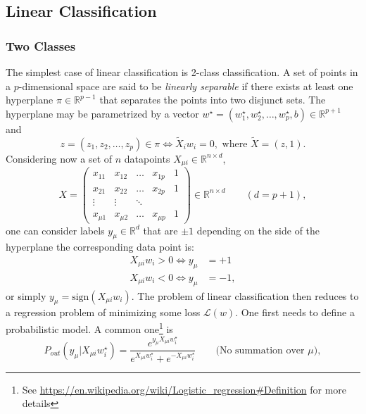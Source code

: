 \documentclass{article}
\begin{document}
\subsection{Linear Classification}
\subsubsection*{Two Classes}
The simplest case of linear classification is 2-class classification. A set of points in a $p$-dimensional space are said to be \emph{linearly separable} if there exists at least one hyperplane $\pi \in \mathbb{R}^{p-1}$ that separates the points into two disjunct sets. The hyperplane may be parametrized by a vector $w^{\star} = (w_1^{\star} , w_2^{\star} , \dots , w_p^{\star}, b) \in \mathbb{R}^{p+1}$ and
\begin{equation}
    z = (z_1 , z_2 , \dots , z_p)
    \in \pi \iff \tilde{X}_i w_i = 0, \text{ where }
    \tilde{X} = (z,1).
\end{equation}
Considering now a set of $n$ datapoints $X_{\mu i} \in \mathbb{R}^{n \times d}$,
\begin{equation}
    X =
    \begin{pmatrix}
        x_{1 1} & x_{1 2} & \dots & x_{1 p} & 1 \\
        x_{2 1} & x_{2 2} & \dots & x_{2 p} & 1 \\
        \vdots & \vdots & \ddots & \\
        x_{\mu 1} & x_{\mu 2} & \dots & x_{\mu p} & 1
    \end{pmatrix}
    \in \mathbb{R}^{n\times d} \quad \quad (d=p+1),
\end{equation}
one can consider labels $y_{\mu}\in \mathbb{R}^{d}$ that are $\pm 1$ depending on the side of the hyperplane the corresponding data point is:
\begin{align*}
    X_{\mu i} w_i > 0 \iff y_{\mu} &= +1 \\
    X_{\mu i} w_i < 0 \iff y_{\mu} &= -1,
\end{align*}
or simply $y_{\mu} = \text{sign}(X_{\mu i} w_i)$. The problem of linear classification then reduces to a regression problem of minimizing some loss $\mathcal{L}(w)$. One first needs to define a probabilistic model. A common one\footnote{See \url{https://en.wikipedia.org/wiki/Logistic_regression\#Definition} for more details} is
\begin{equation}
    P_{out} (y_{\mu} | X_{\mu i} w^{\star}_i)
    =
    \frac{e^{y_{\mu} X_{\mu i} w^{\star}_i}}{e^{X_{\mu i} w^{\star}_i} + e^{-X_{\mu i} w^{\star}_i}}
    \quad\quad \text{(No summation over $\mu$)},
    \label{eq:logisticlikelihood}
\end{equation}
\end{document}
